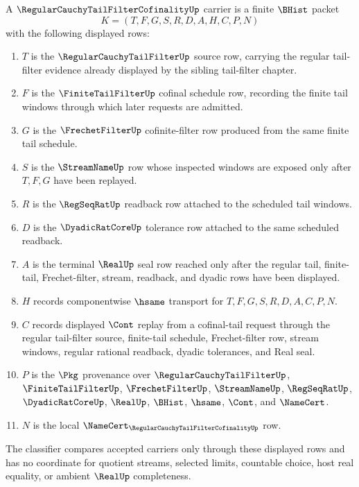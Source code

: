 \begin{definition}
\label{def:regular-cauchy-tail-filter-cofinality-carrier}
A $\RegularCauchyTailFilterCofinalityUp$ carrier is a finite $\BHist$ packet
$$
K=(T,F,G,S,R,D,A,H,C,P,N)
$$
with the following displayed rows:
\begin{enumerate}
\item $T$ is the $\RegularCauchyTailFilterUp$ source row, carrying the regular tail-filter evidence already displayed by the sibling tail-filter chapter.
\item $F$ is the $\FiniteTailFilterUp$ cofinal schedule row, recording the finite tail windows through which later requests are admitted.
\item $G$ is the $\FrechetFilterUp$ cofinite-filter row produced from the same finite tail schedule.
\item $S$ is the $\StreamNameUp$ row whose inspected windows are exposed only after $T,F,G$ have been replayed.
\item $R$ is the $\RegSeqRatUp$ readback row attached to the scheduled tail windows.
\item $D$ is the $\DyadicRatCoreUp$ tolerance row attached to the same scheduled readback.
\item $A$ is the terminal $\RealUp$ seal row reached only after the regular tail, finite-tail, Frechet-filter, stream, readback, and dyadic rows have been displayed.
\item $H$ records componentwise $\hsame$ transport for $T,F,G,S,R,D,A,C,P,N$.
\item $C$ records displayed $\Cont$ replay from a cofinal-tail request through the regular tail-filter source, finite-tail schedule, Frechet-filter row, stream windows, regular rational readback, dyadic tolerances, and Real seal.
\item $P$ is the $\Pkg$ provenance over $\RegularCauchyTailFilterUp$, $\FiniteTailFilterUp$, $\FrechetFilterUp$, $\StreamNameUp$, $\RegSeqRatUp$, $\DyadicRatCoreUp$, $\RealUp$, $\BHist$, $\hsame$, $\Cont$, and $\NameCert$.
\item $N$ is the local $\NameCert_{\RegularCauchyTailFilterCofinalityUp}$ row.
\end{enumerate}
The classifier compares accepted carriers only through these displayed rows and has no coordinate for quotient streams, selected limits, countable choice, host real equality, or ambient $\RealUp$ completeness.
\end{definition}


